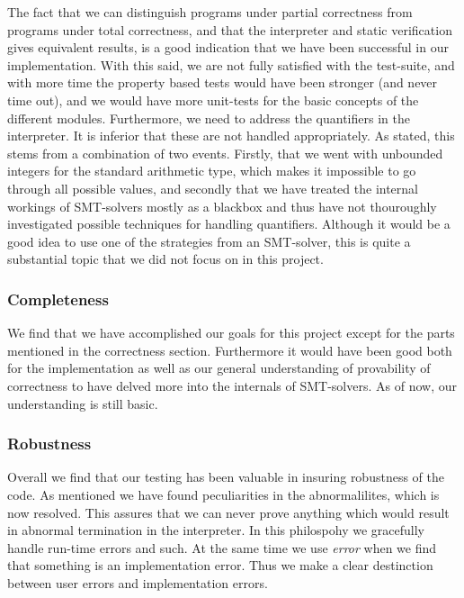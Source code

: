 The fact that we can distinguish programs under partial correctness from programs under total correctness, and that the interpreter and static verification gives equivalent results, is a good indication that we have been successful in our implementation.
With this said, we are not fully satisfied with the test-suite, and with more time the property based tests would have been stronger (and never time out), and we would have more unit-tests for the basic concepts of the different modules.
Furthermore, we need to address the quantifiers in the interpreter.
It is inferior that these are not handled appropriately.
As stated, this stems from a combination of two events.
Firstly, that we went with unbounded integers for the standard arithmetic type, which makes it impossible to go through all possible values, and secondly that we have treated the internal workings of SMT-solvers mostly as a blackbox and thus have not thouroughly investigated possible techniques for handling quantifiers. 
Although it would be a good idea to use one of the strategies from an SMT-solver, this is quite a substantial topic that we did not focus on in this project.

\subsubsection{Completeness}
We find that we have accomplished our goals for this project except for the parts mentioned in the correctness section.
Furthermore it would have been good both for the implementation as well as our general understanding of provability of correctness to have delved more into the internals of SMT-solvers.
As of now, our understanding is still basic.

\subsubsection{Robustness}
Overall we find that our testing has been valuable in insuring robustness of the code. As mentioned we have found peculiarities in the abnormalilites, which is now resolved. 
This assures that we can never prove anything which would result in abnormal termination in the interpreter. 
In this philospohy we gracefully handle run-time errors and such. 
At the same time we use \textit{error} when we find that something is an implementation error. 
Thus we make a clear destinction between user errors and implementation errors.

